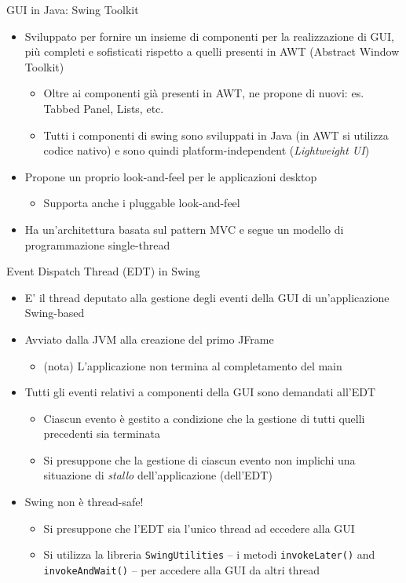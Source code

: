\documentclass[presentation]{beamer}
\begin{document}
\begin{frame}{GUI in Java: Swing Toolkit}
\begin{itemize}\itemsep10pt
\item Sviluppato per fornire un insieme di componenti per la realizzazione di GUI, più completi e sofisticati rispetto a quelli presenti in AWT (Abstract Window Toolkit)
\begin{itemize}
\item Oltre ai componenti già presenti in AWT, ne propone di nuovi: es. Tabbed Panel, Lists, etc.
\item Tutti i componenti di swing sono sviluppati in Java (in AWT si utilizza codice nativo) e sono quindi platform-independent (\textit{Lightweight UI})
\end{itemize}
\item Propone un proprio look-and-feel per le applicazioni desktop
\begin{itemize}
\item Supporta anche i pluggable look-and-feel
\end{itemize}
\item Ha un'architettura basata sul pattern MVC e segue un modello di programmazione single-thread
\end{itemize}
\end{frame}


\begin{frame}{Event Dispatch Thread (EDT) in Swing}
\begin{itemize}\itemsep10pt
\item E' il thread deputato alla gestione degli eventi della GUI di un'applicazione Swing-based
\item Avviato dalla JVM alla creazione del primo JFrame
\begin{itemize}
\item (nota) L'applicazione non termina al completamento del main
\end{itemize}
\item Tutti gli eventi relativi a componenti della GUI sono demandati all'EDT
\begin{itemize}
\item Ciascun evento è gestito a condizione che la gestione di tutti quelli precedenti sia terminata
\item Si presuppone che la gestione di ciascun evento non implichi una situazione di \emph{stallo} dell'applicazione (dell'EDT)
\end{itemize}
\item Swing non è thread-safe!
\begin{itemize}
\item Si presuppone che l'EDT sia l'unico thread ad eccedere alla GUI
\item Si utilizza la libreria \texttt{SwingUtilities} -- i metodi \texttt{invokeLater()} and \texttt{invokeAndWait()} -- per accedere alla GUI da altri thread
\end{itemize}
\end{itemize}
\end{frame}
\end{document}
